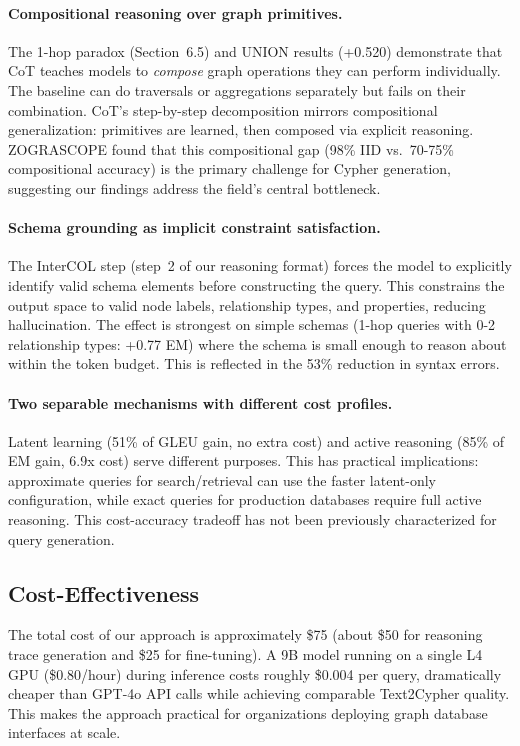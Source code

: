 \documentclass[11pt]{article}
\begin{document}
\paragraph{Compositional reasoning over graph primitives.} The 1-hop paradox (Section~6.5) and UNION results (+0.520) demonstrate that CoT teaches models to \emph{compose} graph operations they can perform individually. The baseline can do traversals or aggregations separately but fails on their combination. CoT's step-by-step decomposition mirrors compositional generalization: primitives are learned, then composed via explicit reasoning. ZOGRASCOPE \citep{zograscope2025} found that this compositional gap (98\% IID vs.\ 70-75\% compositional accuracy) is the primary challenge for Cypher generation, suggesting our findings address the field's central bottleneck.

\paragraph{Schema grounding as implicit constraint satisfaction.} The InterCOL step (step~2 of our reasoning format) forces the model to explicitly identify valid schema elements before constructing the query. This constrains the output space to valid node labels, relationship types, and properties, reducing hallucination. The effect is strongest on simple schemas (1-hop queries with 0-2 relationship types: +0.77 EM) where the schema is small enough to reason about within the token budget. This is reflected in the 53\% reduction in syntax errors.

\paragraph{Two separable mechanisms with different cost profiles.} Latent learning (51\% of GLEU gain, no extra cost) and active reasoning (85\% of EM gain, 6.9x cost) serve different purposes. This has practical implications: approximate queries for search/retrieval can use the faster latent-only configuration, while exact queries for production databases require full active reasoning. This cost-accuracy tradeoff has not been previously characterized for query generation.

\subsection{Cost-Effectiveness}

The total cost of our approach is approximately \$75 (about \$50 for reasoning trace generation and \$25 for fine-tuning). A 9B model running on a single L4 GPU (\$0.80/hour) during inference costs roughly \$0.004 per query, dramatically cheaper than GPT-4o API calls while achieving comparable Text2Cypher quality. This makes the approach practical for organizations deploying graph database interfaces at scale.
\end{document}
